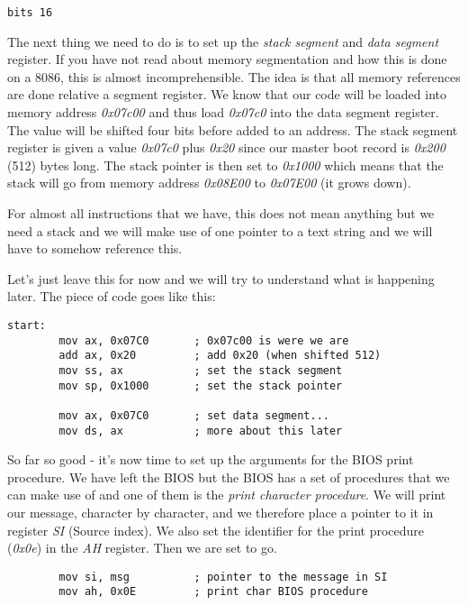 \documentclass[a4paper,11pt]{article}
\begin{document}
\begin{verbatim}
bits 16
\end{verbatim}

The next thing we need to do is to set up the {\em stack segment} and
{\em data segment} register. If you have not read about memory
segmentation and how this is done on a 8086, this is almost
incomprehensible. The idea is that all memory references are done
relative a segment register. We know that our code will be loaded into
memory address {\em 0x07c00} and thus load {\em 0x07c0} into the data
segment register. The value will be shifted four bits before added to
an address. The stack segment register is given a value {\em 0x07c0}
plus {\em 0x20} since our master boot record is {\em 0x200} (512)
bytes long. The stack pointer is then set to {\em 0x1000} which means
that the stack will go from memory address {\em 0x08E00} to {\em
 0x07E00} (it grows down).

For almost all instructions that we have, this does not mean anything
but we need a stack and we will make use of one pointer to a text
string and we will have to somehow reference this.

Let's just leave this for now and we will try to understand what is
happening later. The piece of code goes like this:

\begin{verbatim}
start:
        mov ax, 0x07C0       ; 0x07c00 is were we are
        add ax, 0x20         ; add 0x20 (when shifted 512)
        mov ss, ax           ; set the stack segment  
        mov sp, 0x1000       ; set the stack pointer

        mov ax, 0x07C0       ; set data segment...
        mov ds, ax           ; more about this later
\end{verbatim}

So far so good - it's now time to set up the arguments for the BIOS
print procedure. We have left the BIOS but the BIOS has a set of
procedures that we can make use of and one of them is the {\em print
  character procedure}. We will print our message, character by character,
and we therefore place a pointer to it in register {\em SI}
(Source index).  We also set the identifier for the print
procedure ({\em 0x0e}) in the {\em AH} register. Then we are set to go.

\begin{verbatim}
        mov si, msg          ; pointer to the message in SI
        mov ah, 0x0E         ; print char BIOS procedure
\end{verbatim}
\end{document}

